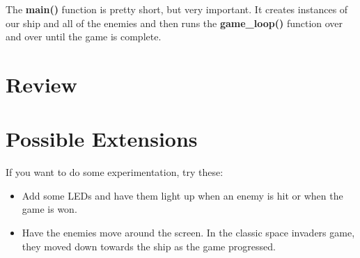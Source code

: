 The \textbf{main()} function is pretty short, but very important. It creates instances of our ship and all
of the enemies and then runs the \textbf{game\_loop()} function over and over until the game is complete.

\section{Review}

\section{Possible Extensions}
If you want to do some experimentation, try these:

\begin{itemize}
    \item Add some LEDs and have them light up when an enemy is hit or when the game is won.
    \item Have the enemies move around the screen. In the classic space invaders game, they moved down towards the ship as the game progressed.
\end{itemize}
